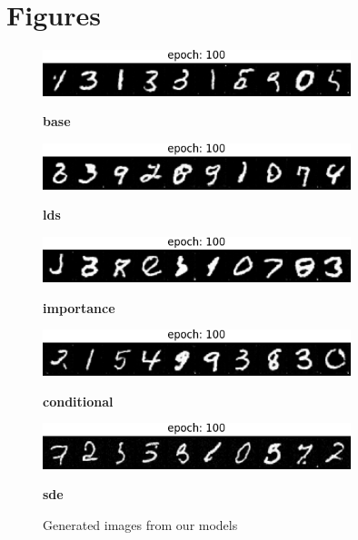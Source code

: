 \pagebreak
\section{Figures}

\begin{figure}[H]
  \centering
      \includegraphics[width=0.8\textwidth]{./figures/base_digits.png} %
      \par \textbf{base} \par
      \vspace{0.5em} %
      
      \includegraphics[width=0.8\textwidth]{./figures/lds_digits.png}
      \par \textbf{lds} \par
      \vspace{0.5em}
      
      \includegraphics[width=0.8\textwidth]{./figures/importance_digits.png}
      \par \textbf{importance} \par
      \vspace{0.5em}
      
      \includegraphics[width=0.8\textwidth]{./figures/cond_digits.png}
      \par \textbf{conditional} \par
      \vspace{0.5em}
      
      \includegraphics[width=0.8\textwidth]{./figures/sde_digits.png}
      \par \textbf{sde} \par
      
      \caption{Generated images from our models}
  
      \label{fig:ddpm:gensamples}
\end{figure}

